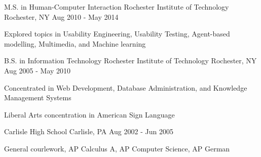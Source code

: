 

\begin{cventries}

  \cventry
    {M.S. in Human-Computer Interaction} %
    {Rochester Institute of Technology} %
    {Rochester, NY} %
    {Aug 2010 - May 2014} %
    {
      \begin{cvitems} %
        \item {Explored topics in Usability Engineering, Usability Testing, Agent-based modelling, Multimedia, and Machine learning}
      \end{cvitems}
    }


  \cventry
    {B.S. in Information Technology} %
    {Rochester Institute of Technology} %
    {Rochester, NY} %
    {Aug 2005 - May 2010} %
    {
      \begin{cvitems} %
        \item {Concentrated in Web Development, Database Administration, and Knowledge Management Systems}
        \item {Liberal Arts concentration in American Sign Language}
      \end{cvitems}
    }


  \cventry
    {} %
    {Carlisle High School} %
    {Carlisle, PA} %
    { Aug 2002 - Jun 2005} %
    {
      \begin{cvitems} %
        \item {General courlework, AP Calculus A, AP Computer Science, AP German}
      \end{cvitems}
    }

\end{cventries}
